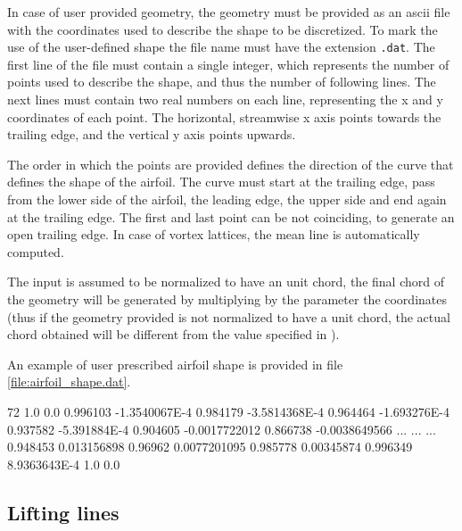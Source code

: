 In case of user provided geometry, the geometry must be provided as an ascii file with the 
coordinates used to describe the shape to be discretized. To mark the use of the user-defined 
shape the file name must have the extension \texttt{.dat}. 
The first line of the file must contain a single integer, which represents the number of points 
used to describe the shape, and thus the number of following lines. 
The next lines must contain two real numbers on each line, representing the x and y coordinates 
of each point. The horizontal, streamwise x axis points  towards the trailing edge, 
and the vertical y axis points upwards. 

The order in which the points are provided defines the direction of the curve that 
defines the shape of the airfoil. The curve must start at the trailing edge, 
pass from the lower side of the airfoil, the leading edge, the upper side and end 
again at the trailing edge. The first and last point can be not coinciding, 
to generate an open trailing edge. In case of vortex lattices, the mean line is 
automatically computed. 

The input is assumed to be normalized to have an unit chord, the final chord of 
the geometry will be generated by multiplying by the  parameter the coordinates 
(thus if the geometry provided is not normalized to have a unit chord, 
the actual chord obtained will be different from the value specified in ).

An example of user prescribed airfoil shape is provided in file \ref{file:airfoil_shape.dat}.

\begin{inputfile}[frame=single, caption={Example of user specified airfoil shape 
  (the middle lines have been suppressed for brevity)}, label={file:airfoil_shape.dat}]
72
1.0      0.0   
0.996103      -1.3540067E-4   
0.984179      -3.5814368E-4   
0.964464      -1.693276E-4   
0.937582      -5.391884E-4   
0.904605      -0.0017722012   
0.866738      -0.0038649566   
...
...
...
0.948453      0.013156898   
0.96962      0.0077201095   
0.985778      0.00345874   
0.996349      8.9363643E-4   
1.0      0.0   
\end{inputfile}

\subsection{Lifting lines}

